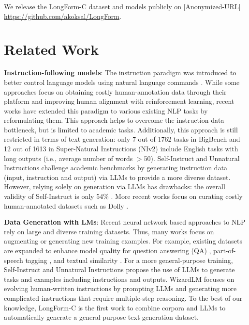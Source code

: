 We release  the LongForm-C dataset and models publicly on 
        {[Anonymized-URL]}
        {\url{https://github.com/akoksal/LongForm}}.

	\section{Related Work}
	\textbf{Instruction-following models}: The instruction paradigm was introduced to better control language models using natural language commands \cite{ouyang2022training,
	wang-etal-2022-super, chen-etal-2022-mtg, wei2022finetuned}. While some approaches \cite{ouyang2022training} focus on obtaining costly human-annotation data through their platform  and improving human alignment with reinforcement learning, recent works \cite{srivastava2022imitation,
	wang-etal-2022-super} have extended this paradigm to various existing NLP tasks by reformulating them. This approach helps to overcome the instruction-data bottleneck, but is limited to academic tasks. Additionally, this approach is still restricted in terms of text generation: only 7 out of 1762 tasks in BigBench \cite{srivastava2022imitation} and 12 out of 1613 in Super-Natural Instructions (NIv2) \cite{wang-etal-2022-super} include English tasks with long outputs (i.e., average number of words $>$50). Self-Instruct \cite{wang2022selfinstruct} and Unnatural Instructions \cite{honovich2022unnatural} challenge academic benchmarks by generating instruction data (input, instruction and output) via LLMs to provide a more diverse dataset. However, relying solely on generation via LLMs has drawbacks: the overall validity of Self-Instruct is only 54\% \cite{wang2022selfinstruct}. More recent works focus on curating costly human-annotated datasets such as Dolly \cite{DatabricksBlog2023DollyV2}.

	\textbf{Data Generation with LMs}: Recent neural network based approaches to NLP rely on large and diverse training datasets. Thus, many works focus on augmenting or generating new training examples. For example, existing datasets are expanded  to enhance model quality for question answering (QA) \cite{longpre-etal-2019-exploration}, part-of-speech tagging \cite{sahin-steedman-2018-data}, and textual similarity \cite{schick-schutze-2021-generating}. For a more general-purpose training, Self-Instruct \cite{wang2022selfinstruct} and Unnatural Instructions \cite{honovich2022unnatural} propose the use of LLMs to generate tasks and examples including instructions and outputs. WizardLM \cite{xu2024wizardlm} focuses on evolving human-written instructions by prompting LLMs and generating more complicated instructions that require multiple-step reasoning. To the best of our knowledge, LongForm-C is the first work to combine corpora and LLMs to automatically generate a general-purpose text generation dataset.


